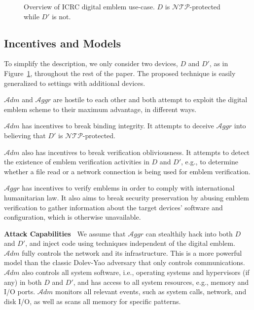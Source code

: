 \documentclass[letterpaper,twocolumn,10pt]{article}
\newcommand{\T}{\ensuremath{\mathcal{A}ggr}\xspace}
\newcommand{\N}{\ensuremath{\mathcal{N\!T}\mathcal{\!P}}\xspace}
\newcommand{\ADM}{\ensuremath{\mathcal{A}dm}\xspace}
\newcommand{\dn}{\ensuremath{D}\xspace}
\newcommand{\da}{\ensuremath{D'}\xspace}
\newcommand{\mypara}[1]{\vspace{.5em}\noindent\textbf{{#1}~}}
\begin{document}
\begin{figure}[ht]
  \caption{Overview of ICRC digital emblem use-case. \dn is \N-protected while \da is not.}
  \label{fig:red-cross-use-case}
\end{figure}

\subsection{Incentives and Models}
\label{sec:adv}
To simplify the description, we only consider two devices, \dn and \da, as in Figure~\ref{fig:red-cross-use-case},
throughout the rest of the paper. The proposed technique is easily generalized to settings with additional devices.

\ADM and \T are hostile to each other and both attempt to exploit the digital emblem scheme to their maximum
advantage, in different ways.
%
\begin{compactitem}
%
\item  \ADM has incentives to break binding integrity. It attempts to deceive
\T into believing that \da is \N-protected.
%
\item \ADM also has incentives to break verification obliviousness. It attempts to detect the existence of emblem
verification activities in \dn and \da, e.g., to determine whether a file read or a network connection is being used
for emblem verification.
%
\item \T has incentives to verify emblems in order to comply with international humanitarian law. It also aims
to break security preservation by abusing emblem verification to gather information about the target devices'
software and configuration, which is otherwise unavailable.
%
\end{compactitem}
%

\mypara{Attack Capabilities}
We assume that \T can stealthily hack into both \dn and \da, and inject code using techniques independent
of the digital emblem. \ADM fully controls the network and its infrastructure. This is a more powerful model
than the classic Dolev-Yao adversary \cite{dolevSecurityPublicKey1983} that only controls communications.
\ADM also controls all system software, i.e., operating systems and hypervisors (if any) in
both \dn and \da, and has access to all system resources, e.g., memory and I/O ports.
\ADM monitors all relevant events, such as system calls, network, and disk I/O, as well as
scans all memory for specific patterns.
\end{document}
